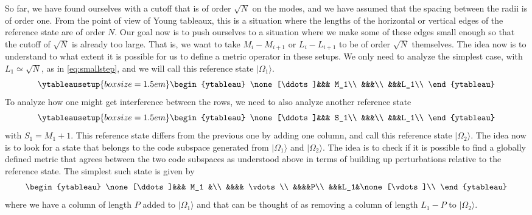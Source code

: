 \documentclass[12pt,nofootinbib, longbibliography]{revtex4-1}
\newcommand\ket[1]{| #1\rangle}
\begin{document}
So far, we have found ourselves with a cutoff that is of order $\sqrt N$ on the modes, and we have assumed that the spacing between the radii is of order one.  From the point of view of Young tableaux, this is a situation where the lengths of the horizontal or vertical edges of the reference state are of order $N$. Our goal now is to push ourselves to a situation where we make some of these edges small enough so that the cutoff of $\sqrt N$ is already too large. That is, we want to take $M_i-M_{i+1}$ or $L_i-L_{i+1}$ to be of order $\sqrt N$ themselves. The idea now is to understand to what extent it is possible for us to define a metric operator in these setups. We only need to analyze the simplest case, with $L_1\simeq \sqrt N$, as in \eqref{eq:smallstep}, and we will call this  reference state $\ket {\Omega_1}$.
\begin{equation}
 \ytableausetup{boxsize=1.5 em}
\begin{ytableau}
\none[\ddots]&&& M_1\\
&&&\\
&&&L_1\\
\end{ytableau}\label{eq:smallstep}
\end{equation}
To analyze how one might get interference between the rows, we need to also analyze another reference state
\begin{equation}
 \ytableausetup{boxsize=1.5 em}
\begin{ytableau}
\none[\ddots]&&& S_1\\
&&&\\
&&&L_1\\
\end{ytableau}\label{eq:smallstep}
\end{equation}
with $S_1=M_1+1$. This reference state differs from the previous one by adding one column, and call this reference state $\ket{\Omega_2}$. The idea now is to look for a state that belongs to the code subspace generated from $\ket {\Omega_1}$ and $\ket {\Omega_2}$. The idea is to check if it is possible to find a globally defined metric that agrees between the two code subspaces as understood above in terms of building up perturbations relative to the reference state. The simplest such state is given by  
\begin{equation}
\begin{ytableau}
\none[\ddots]&&& M_1 &\\
&&&& \vdots\\
&&&&P\\
&&&L_1&\none[\vdots]\\
\end{ytableau}\label{eq:smallstep}
\end{equation}
where we have a column of length $P$ added to $\ket {\Omega_1}$ and that can be thought of as removing a column of length $L_1-P$ to $\ket{\Omega_2}$.
\end{document}

